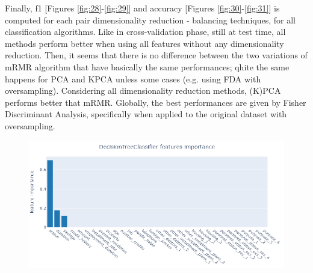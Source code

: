 \documentclass[letterpaper]{article}
\begin{document}
	\newpage Finally, f1 [Figures \ref{fig:28}-\ref{fig:29}] and accuracy [Figures \ref{fig:30}-\ref{fig:31}] is computed for each pair dimensionality reduction - balancing techniques, for all classification algorithms. Like in cross-validation phase, still at test time, all methods perform better when using all features without any dimensionality reduction. Then, it seems that there is no difference between the two variations of mRMR algorithm that have basically the same performances; qhite the same happens for PCA and KPCA unless some cases (e.g. using FDA with oversampling). Considering all dimensionality reduction methods, (K)PCA performs better that mRMR. Globally, the best performances are given by Fisher Discriminant Analysis, specifically when applied to the original dataset with oversampling.
	\begin{figure}[!h]
		\centering
		\includegraphics[width=.9\textwidth]{images/DecisionTreeClassifier_features_importance.png}
		\setlength{\abovecaptionskip}{-5pt}
		\label{fig:32}
	\end{figure}
\end{document}
